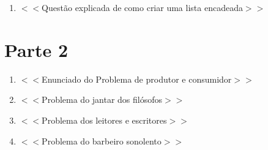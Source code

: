 \documentclass[a4paper,10pt]{article}
\begin{document}
\begin{enumerate}
\begin{itemize}
       \item Linha 3: Fornece informações sobre o número de linhas e colunas de dados armazenados em um arquivo.
       \item Linha 4: Especifica o nível máximo de cinza contido na imagem.
      \end{itemize}
      Um exemplo da estrutura de uma imagem no formato PGM:\\
	\\P5 \\
	\#FGA\/SEM imagem gerada Ver.1.0 (0) \\
	10 10 \\
	255 \\
	0 1 2 3 4 5 6 7 8 9 10 11 12 13 14 15 16 17 18 19 20 21 22 23 24 25 \\
	26 27 28 28 30 31 32 33 34 35 36 37 38 39 40 41 42 43 44 45 46 47 \\
	48 49 50 51 52 53 54 55 56 57 58 59 60 61 62 63 64 65 66 67 68 69 70 \\ 
	71 72 73 74 75 76 77 78 79 80 81 82 83 84 85 86 87 88 89 90 91 92 93 \\
	255 255 255 255 255 255 \\
      Um efeito muito comum que costuma-se dar a esta imagem é o chamado negativo. Este faz com que a cor de cada pixel da imagem original se 
      transforme na cor inversa (por exemplo, um pixel branco se transforma em preto), a cor inversa é o valor da subtração entre 255 e o valor 
      do pixel. Com base nas informações dadas, faça um programa que leia uma imagem no formato PGM, tire o negativo dela e salve-a como uma nova
      imagem.
 \item $<<$Questão explicada de como criar uma lista encadeada$>>$
\end{enumerate}

\section{Parte 2}
  \begin{enumerate}
   \item $<<$Enunciado do Problema de produtor e consumidor$>>$
   \item $<<$Problema do jantar dos filósofos$>>$
   \item $<<$Problema dos leitores e escritores$>>$
   \item $<<$Problema do barbeiro sonolento$>>$
  \end{enumerate}
\end{document}
